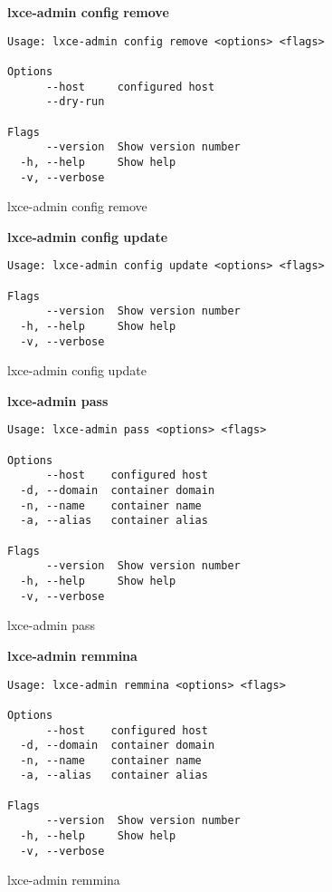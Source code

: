 \textbf{lxce-admin config remove}
\begin{listing}[H]
\begin{verbatim}
Usage: lxce-admin config remove <options> <flags>

Options
      --host     configured host                             
      --dry-run                                              

Flags
      --version  Show version number                                   
  -h, --help     Show help                                             
  -v, --verbose
\end{verbatim}
\caption{lxce-admin config remove}
\label{listings: lxce-admin config remove}
\end{listing}

\textbf{lxce-admin config update}
\begin{listing}[H]
\begin{verbatim}
Usage: lxce-admin config update <options> <flags>

Flags
      --version  Show version number                                   
  -h, --help     Show help                                             
  -v, --verbose
\end{verbatim}
\caption{lxce-admin config update}
\label{listings: lxce-admin config update}
\end{listing}

\newpage
\textbf{lxce-admin pass}
\begin{listing}[H]
\begin{verbatim}
Usage: lxce-admin pass <options> <flags>

Options
      --host    configured host                              
  -d, --domain  container domain                             
  -n, --name    container name                               
  -a, --alias   container alias                              

Flags
      --version  Show version number                        
  -h, --help     Show help                                  
  -v, --verbose
\end{verbatim}
\caption{lxce-admin pass}
\label{listings: lxce-admin pass}
\end{listing}

\textbf{lxce-admin remmina}
\begin{listing}[H]
\begin{verbatim}
Usage: lxce-admin remmina <options> <flags>

Options
      --host    configured host                              
  -d, --domain  container domain                             
  -n, --name    container name                               
  -a, --alias   container alias                              

Flags
      --version  Show version number                        
  -h, --help     Show help                                  
  -v, --verbose
\end{verbatim}
\caption{lxce-admin remmina}
\label{listings: lxce-admin remmina}
\end{listing}

